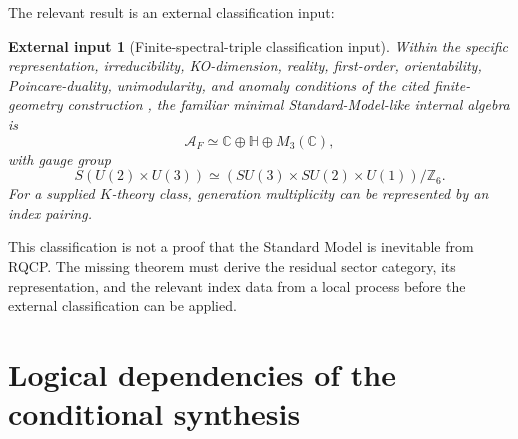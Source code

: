 \documentclass[11pt]{article}
\newtheorem{external}[theorem]{External input}
\newcommand{\A}{\mathcal A}
\begin{document}
The relevant result is an external classification input:
\begin{external}[Finite-spectral-triple classification
input]\label{thm:conditional-ncg-selection}
Within the specific representation, irreducibility, KO-dimension, reality,
first-order, orientability, Poincare-duality, unimodularity, and anomaly
conditions of the cited finite-geometry construction
\cite{ConnesMarcolli,ChamseddineConnes}, the familiar minimal
Standard-Model-like internal algebra is
\[
\A_F\simeq \mathbb C\oplus\mathbb H\oplus M_3(\mathbb C),
\]
with gauge group
\[
S(U(2)\times U(3))\simeq (SU(3)\times SU(2)\times U(1))/\mathbb Z_6.
\]
For a supplied \(K\)-theory class, generation multiplicity can be represented
by an index pairing.
\end{external}

This classification is not a proof that the Standard Model is inevitable
from RQCP.  The missing theorem must derive the residual sector category,
its representation, and the relevant index data from a local process before
the external classification can be applied.

\section{Logical dependencies of the conditional synthesis}
\label{app:synthesis}
\end{document}
